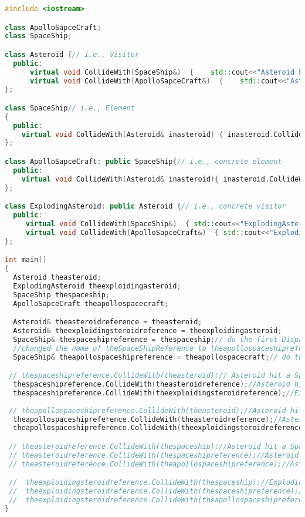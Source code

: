 \documentclass{book}
\begin{document}
\begin{lstlisting}[caption={Double Dispatch sample code 1 - complete code},label={ddcc},language=C++]
#include <iostream>

class ApolloSapceCraft;
class SpaceShip;

class Asteroid {// i.e., Visitor
  public:
      virtual void CollideWith(SpaceShip&)  {    std::cout<<"Asteroid hit a SpaceShip!"<<std::endl;  }
      virtual void CollideWith(ApolloSapceCraft&)  {    std::cout<<"Asteroid hit a ApolloSapceCraft!"<<std::endl;  }
};

class SpaceShip// i.e., Element
{
  public:
    virtual void CollideWith(Asteroid& inasteroid) { inasteroid.CollideWith(*this); }
};

class ApolloSapceCraft: public SpaceShip{// i.e., concrete element
  public:
    virtual void CollideWith(Asteroid& inasteroid){ inasteroid.CollideWith(*this); }
};

class ExplodingAsteroid: public Asteroid {// i.e., concrete visitor
  public:
     virtual void CollideWith(SpaceShip&)  { std::cout<<"ExplodingAsteroid hit a SpaceShip!"<<std::endl;  }
     virtual void CollideWith(ApolloSapceCraft&)  { std::cout<<"ExplodingAsteroid hit a ApolloSapceCraft!"<<std::endl;  }
};

int main()
{
  Asteroid theasteroid;
  ExplodingAsteroid theexploidingasteroid; 
  SpaceShip thespaceship;
  ApolloSapceCraft theapollospacecraft;

  Asteroid& theasteroidreference = theasteroid;
  Asteroid& theexploidingsteroidreference = theexploidingasteroid;
  SpaceShip& thespaceshipreference = thespaceship;// do the first Dispatch
  //changed the name of theSpaceShipReference to theapollospaceshipreference
  SpaceShip& theapollospaceshipreference = theapollospacecraft;// do the first Dispatch

 // thespaceshipreference.CollideWith(theasteroid);// Asteroid hit a SpaceShip!
  thespaceshipreference.CollideWith(theasteroidreference);//Asteroid hit a SpaceShip!
  thespaceshipreference.CollideWith(theexploidingsteroidreference);//ExplodingAsteroid hit a SpaceShip!
  
 // theapollospaceshipreference.CollideWith(theasteroid);//Asteroid hit a ApolloSapceCraft!
  theapollospaceshipreference.CollideWith(theasteroidreference);//Asteroid hit a ApolloSapceCraft!
  theapollospaceshipreference.CollideWith(theexploidingsteroidreference);//ExplodingAsteroid hit a ApolloSapceCraft!

 // theasteroidreference.CollideWith(thespaceship);//Asteroid hit a SpaceShip!
 // theasteroidreference.CollideWith(thespaceshipreference);//Asteroid hit a SpaceShip!
 // theasteroidreference.CollideWith(theapollospaceshipreference);//Asteroid hit a SpaceShip!

 //  theexploidingsteroidreference.CollideWith(thespaceship);//ExplodingAsteroid hit a SpaceShip!
 //  theexploidingsteroidreference.CollideWith(thespaceshipreference);//ExplodingAsteroid hit a SpaceShip!
 //  theexploidingsteroidreference.CollideWith(theapollospaceshipreference);//ExplodingAsteroid hit a SpaceShip!
}
\end{lstlisting}
\end{document}
